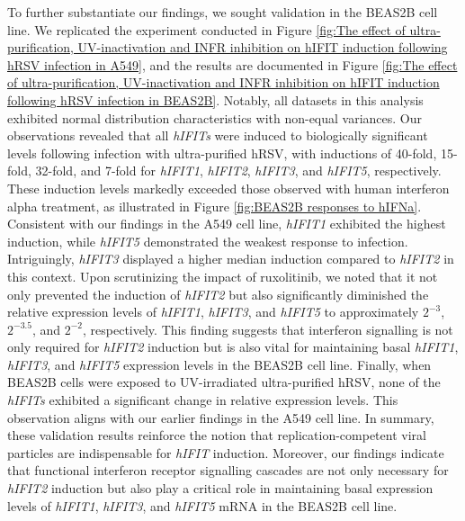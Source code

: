 To further substantiate our findings, we sought validation in the BEAS2B cell line. We replicated the experiment conducted in Figure \ref{fig:The effect of ultra-purification, UV-inactivation and INFR inhibition on hIFIT induction following hRSV infection in A549}, and the results are documented in Figure \ref{fig:The effect of ultra-purification, UV-inactivation and INFR inhibition on hIFIT induction following hRSV infection in BEAS2B}. Notably, all datasets in this analysis exhibited normal distribution characteristics with non-equal variances. Our observations revealed that all \textit{hIFITs} were induced to biologically significant levels following infection with ultra-purified hRSV, with inductions of 40-fold, 15-fold, 32-fold, and 7-fold for \textit{hIFIT1}, \textit{hIFIT2}, \textit{hIFIT3}, and \textit{hIFIT5}, respectively. These induction levels markedly exceeded those observed with human interferon alpha treatment, as illustrated in Figure \ref{fig:BEAS2B responses to hIFNa}. Consistent with our findings in the A549 cell line, \textit{hIFIT1} exhibited the highest induction, while \textit{hIFIT5} demonstrated the weakest response to infection. Intriguingly, \textit{hIFIT3} displayed a higher median induction compared to \textit{hIFIT2} in this context. Upon scrutinizing the impact of ruxolitinib, we noted that it not only prevented the induction of \textit{hIFIT2} but also significantly diminished the relative expression levels of \textit{hIFIT1}, \textit{hIFIT3}, and \textit{hIFIT5} to approximately \(2^{-3}\), \(2^{-3.5}\), and \(2^{-2}\), respectively. This finding suggests that interferon signalling is not only required for \textit{hIFIT2} induction but is also vital for maintaining basal \textit{hIFIT1}, \textit{hIFIT3}, and \textit{hIFIT5} expression levels in the BEAS2B cell line. Finally, when BEAS2B cells were exposed to UV-irradiated ultra-purified hRSV, none of the \textit{hIFITs} exhibited a significant change in relative expression levels. This observation aligns with our earlier findings in the A549 cell line. In summary, these validation results reinforce the notion that replication-competent viral particles are indispensable for \textit{hIFIT} induction. Moreover, our findings indicate that functional interferon receptor signalling cascades are not only necessary for \textit{hIFIT2} induction but also play a critical role in maintaining basal expression levels of \textit{hIFIT1}, \textit{hIFIT3}, and \textit{hIFIT5} mRNA in the BEAS2B cell line.

